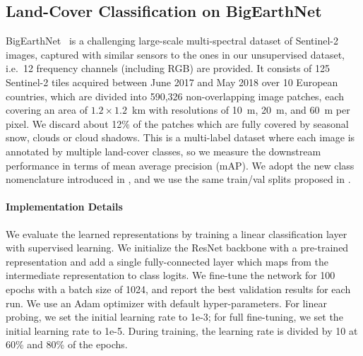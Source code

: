 \documentclass[10pt,twocolumn,letterpaper]{article}
\begin{document}
\subsection{Land-Cover Classification on BigEarthNet}
BigEarthNet~\cite{sumbul2019bigearthnet} is a challenging large-scale multi-spectral dataset of Sentinel-2~\cite{drusch2012sentinel} images, captured with similar sensors to the ones in our unsupervised dataset, i.e.\ 12 frequency channels (including RGB) are provided. It consists of 125 Sentinel-2 tiles acquired between June 2017 and May 2018 over 10 European countries, which are divided into 590,326 non-overlapping image patches, each covering an area of $1.2 \times 1.2$~km with resolutions of 10~m, 20~m, and 60~m per pixel. We discard about 12\% of the patches which are fully covered by seasonal snow, clouds or cloud shadows. This is a multi-label dataset where each image is annotated by multiple land-cover classes, so we measure the downstream performance in terms of mean average precision (mAP). We adopt the new class nomenclature introduced in \cite{sumbul2020bigearthnet}, and we use the same train/val splits proposed in \cite{neumann2019domain}.

\vspace{-1em}\paragraph{Implementation Details}
We evaluate the learned representations by training a linear classification layer with supervised learning. We initialize the ResNet backbone with a pre-trained representation and add a single fully-connected layer which maps from the intermediate representation to class logits. We fine-tune the network for 100 epochs with a batch size of 1024, and report the best validation results for each run. We use an Adam optimizer with default hyper-parameters. For linear probing, we set the initial learning rate to 1e-3; for full fine-tuning, we set the initial learning rate to 1e-5. During training, the learning rate is divided by 10 at 60\% and 80\% of the epochs.
\end{document}
